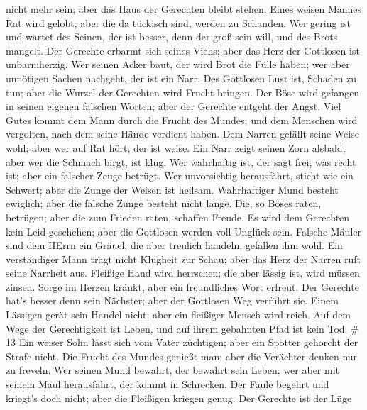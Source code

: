 nicht mehr sein; aber das Haus der Gerechten bleibt stehen. 
Eines weisen Mannes Rat wird gelobt; aber die da tückisch sind, werden
zu Schanden.  Wer gering ist und wartet des Seinen, der ist
besser, denn der groß sein will, und des Brots mangelt. 
Der Gerechte erbarmt sich seines Viehs; aber das Herz der Gottlosen ist
unbarmherzig.  Wer seinen Acker baut, der wird Brot die
Fülle haben; wer aber unnötigen Sachen nachgeht, der ist ein Narr.
 Des Gottlosen Lust ist, Schaden zu tun; aber die Wurzel
der Gerechten wird Frucht bringen.  Der Böse wird gefangen
in seinen eigenen falschen Worten; aber der Gerechte entgeht der Angst.
 Viel Gutes kommt dem Mann durch die Frucht des Mundes; und
dem Menschen wird vergolten, nach dem seine Hände verdient haben.
 Dem Narren gefällt seine Weise wohl; aber wer auf Rat
hört, der ist weise.  Ein Narr zeigt seinen Zorn alsbald;
aber wer die Schmach birgt, ist klug.  Wer wahrhaftig ist,
der sagt frei, was recht ist; aber ein falscher Zeuge betrügt.
 Wer unvorsichtig herausfährt, sticht wie ein Schwert; aber
die Zunge der Weisen ist heilsam.  Wahrhaftiger Mund
besteht ewiglich; aber die falsche Zunge besteht nicht lange.
 Die, so Böses raten, betrügen; aber die zum Frieden raten,
schaffen Freude.  Es wird dem Gerechten kein Leid
geschehen; aber die Gottlosen werden voll Unglück sein. 
Falsche Mäuler sind dem HErrn ein Gräuel; die aber treulich handeln,
gefallen ihm wohl.  Ein verständiger Mann trägt nicht
Klugheit zur Schau; aber das Herz der Narren ruft seine Narrheit aus.
 Fleißige Hand wird herrschen; die aber lässig ist, wird
müssen zinsen.  Sorge im Herzen kränkt, aber ein
freundliches Wort erfreut.  Der Gerechte hat's besser denn
sein Nächster; aber der Gottlosen Weg verführt sie.  Einem
Lässigen gerät sein Handel nicht; aber ein fleißiger Mensch wird reich.
 Auf dem Wege der Gerechtigkeit ist Leben, und auf ihrem
gebahnten Pfad ist kein Tod. \# 13  Ein weiser Sohn lässt
sich vom Vater züchtigen; aber ein Spötter gehorcht der Strafe nicht.
 Die Frucht des Mundes genießt man; aber die Verächter
denken nur zu freveln.  Wer seinen Mund bewahrt, der bewahrt
sein Leben; wer aber mit seinem Maul herausfährt, der kommt in
Schrecken.  Der Faule begehrt und kriegt's doch nicht; aber
die Fleißigen kriegen genug.  Der Gerechte ist der Lüge
